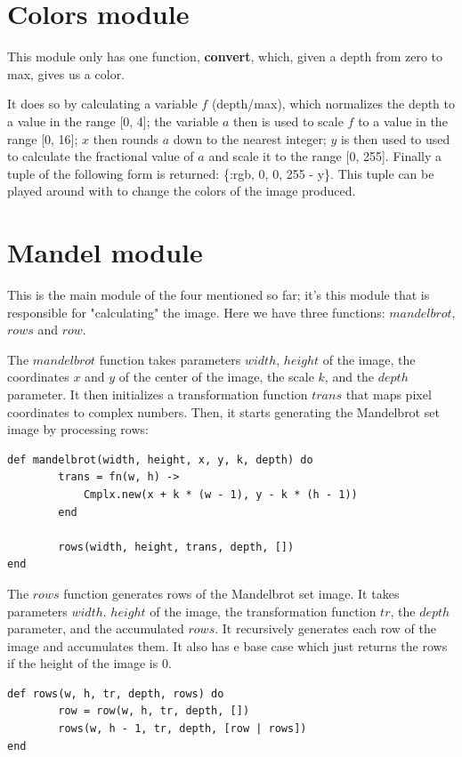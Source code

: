 \documentclass[a4paper,11pt]{article}
\begin{document}
\section*{Colors module}
This module only has one function, \textbf{convert}, which, given a depth from zero to max, gives us a color. 

It does so by calculating a variable $f$ (depth/max), which normalizes the depth to a value in the range {[0, 4]}; the variable $a$ then is used to scale $f$ to a value in the range {[0, 16]}; $x$ then rounds $a$ down to the nearest integer; $y$ is then used to used to calculate the fractional value of $a$ and scale it to the range {[0, 255]}. Finally a tuple of the following form is returned: \{:rgb, 0, 0, 255 - y\}. This tuple can be played around with to change the colors of the image produced.

\section*{Mandel module}
This is the main module of the four mentioned so far; it's this module that is responsible for "calculating" the image. Here we have three functions: $mandelbrot$, $rows$ and $row$.

The $mandelbrot$ function takes parameters $width$, $height$ of the image, the coordinates $x$ and $y$ of the center of the image, the scale $k$, and the $depth$ parameter. It then initializes a transformation function $trans$ that maps pixel coordinates to complex numbers. Then, it starts generating the Mandelbrot set image by processing rows:
\begin{verbatim}
def mandelbrot(width, height, x, y, k, depth) do
        trans = fn(w, h) ->
            Cmplx.new(x + k * (w - 1), y - k * (h - 1))
        end

        rows(width, height, trans, depth, [])
end
\end{verbatim}

The $rows$ function generates rows of the Mandelbrot set image. It takes parameters $width$. $height$ of the image, the transformation function $tr$, the $depth$ parameter, and the accumulated $rows$. It recursively generates each row of the image and accumulates them. It also has e base case which just returns the rows if the height of the image is 0.
\begin{verbatim}
def rows(w, h, tr, depth, rows) do
        row = row(w, h, tr, depth, [])
        rows(w, h - 1, tr, depth, [row | rows])
end
\end{verbatim}
\end{document}
